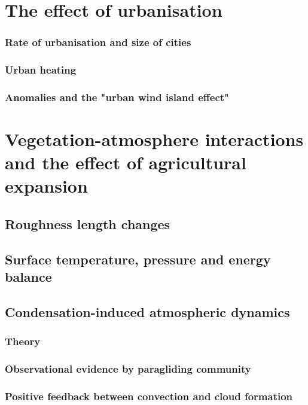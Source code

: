 \section{The effect of urbanisation}

\subsubsection{Rate of urbanisation and size of cities}

\subsubsection{Urban heating}

\subsubsection{Anomalies and the "urban wind island effect"}

\section[Vegetation-atmosphere interactions]{Vegetation-atmosphere interactions and the effect of agricultural expansion}

\subsection{Roughness length changes}

\subsection{Surface temperature, pressure and energy balance}

\subsection{Condensation-induced atmospheric dynamics}

\subsubsection{Theory}

\subsubsection{Observational evidence by paragliding community}

\subsubsection{Positive feedback between convection and cloud formation}

